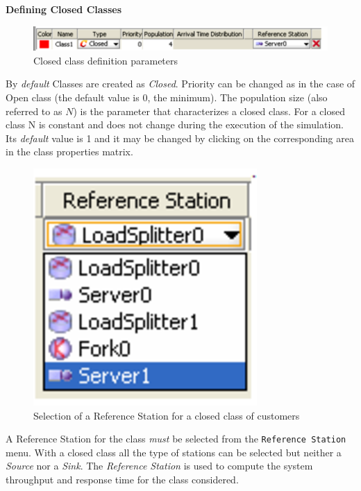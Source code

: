 \textbf{Defining Closed Classes}
\begin{figure}[htb]
    \begin{center}
        \includegraphics[scale=.5]{img/jsimg/3.7.eps}
    \end{center}
    \caption{Closed class definition parameters}
    \label{fig:closecldef}
\end{figure}


By \emph{default} Classes are created as \emph{Closed}. Priority
can be changed as in the case of Open class (the default value is
0, the minimum). The population size (also referred to as $N$) is
the parameter that characterizes a closed class.  For a closed
class N is constant and does not change during the execution of
the simulation. Its \emph{default} value is 1 and it may be
changed by clicking on the corresponding area in the class
properties matrix.
\begin{figure}[htb]
    \begin{center}
        \includegraphics[scale=.5]{img/jsimg/3.8.eps}
    \end{center}
    \caption{Selection of a Reference Station for a closed class of customers}
    \label{fig:closerefstat}
\end{figure}
A Reference Station for the class \emph{must} be selected from the
\texttt{Reference Station} menu. With a closed class all the type
of stations can be selected but neither a \emph{Source} nor a
\emph{Sink}. The \emph{Reference Station} is used to compute the
system throughput and response time for the class considered.

